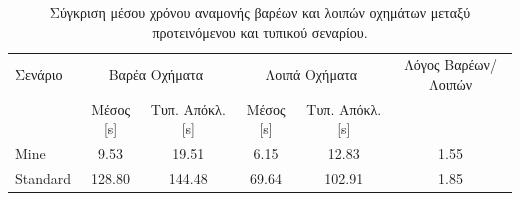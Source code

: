 \begin{table}[h]
\centering
\begin{tabular}{l|cc|cc|c}
\toprule
Σενάριο & \multicolumn{2}{c|}{Βαρέα Οχήματα} & \multicolumn{2}{c|}{Λοιπά Οχήματα} & Λόγος Βαρέων/Λοιπών \\
 & Μέσος [s] & Τυπ. Απόκλ. [s] & Μέσος [s] & Τυπ. Απόκλ. [s] &  \\
\midrule
Mine & 9.53 & 19.51 & 6.15 & 12.83 & 1.55 \\
Standard & 128.80 & 144.48 & 69.64 & 102.91 & 1.85 \\
\bottomrule
\end{tabular}
\caption{Σύγκριση μέσου χρόνου αναμονής βαρέων και λοιπών οχημάτων μεταξύ προτεινόμενου και τυπικού σεναρίου.}
\end{table}
